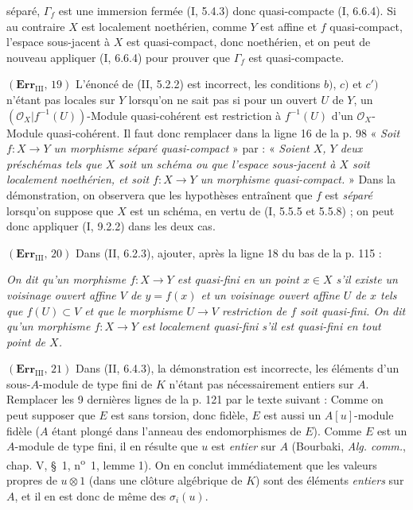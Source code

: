 séparé, $\Gamma_f$ est une immersion fermée (I, 5.4.3) donc quasi-compacte
(I, 6.6.4). Si au contraire $X$ est localement noethérien, comme $Y$ est affine
et $f$ quasi-compact, l'espace sous-jacent à $X$ est quasi-compact, donc
noethérien, et on peut de nouveau appliquer (I, 6.6.4) pour prouver que
$\Gamma_f$ est quasi-compacte.

\noindent\textbf{$(\mathbf{Err}_{\mathrm{III}},\,19)$} L'énoncé de (II,
5.2.2) est incorrect, les conditions $b)$, $c)$ et $c')$ n'étant pas locales
sur $Y$ lorsqu'on ne sait pas si pour un ouvert $U$ de $Y$, un
$(\mathscr O_X|f^{-1}(U))$-Module quasi-cohérent est restriction à $f^{-1}(U)$
d'un $\mathscr O_X$-Module quasi-cohérent. Il faut donc remplacer dans la ligne
16 de la p. 98 « \emph{Soit $f:X\to Y$ un morphisme séparé quasi-compact} »
par : « \emph{Soient $X$, $Y$ deux préschémas tels que $X$ soit un schéma ou
que l'espace sous-jacent à $X$ soit localement noethérien, et soit
$f:X\to Y$ un morphisme quasi-compact.} » Dans la démonstration, on observera
que les hypothèses entraînent que $f$ est \emph{séparé} lorsqu'on suppose que
$X$ est un schéma, en vertu de (I, 5.5.5 et 5.5.8) ; on peut donc appliquer
(I, 9.2.2) dans les deux cas.

\noindent\textbf{$(\mathbf{Err}_{\mathrm{III}},\,20)$} Dans (II, 6.2.3),
ajouter, après la ligne 18 du bas de la p. 115 :

\emph{On dit qu'un morphisme $f:X\to Y$ est quasi-fini en un point $x\in X$
s'il existe un voisinage ouvert affine $V$ de $y=f(x)$ et un voisinage ouvert
affine $U$ de $x$ tels que $f(U)\subset V$ et que le morphisme $U\to V$
restriction de $f$ soit quasi-fini. On dit qu'un morphisme $f:X\to Y$ est
localement quasi-fini s'il est quasi-fini en tout point de $X$.}

\noindent\textbf{$(\mathbf{Err}_{\mathrm{III}},\,21)$} Dans (II, 6.4.3), la
démonstration est incorrecte, les éléments d'un sous-$A$-module de type fini de
$K$ n'étant pas nécessairement entiers sur $A$. Remplacer les 9 dernières lignes
de la p. 121 par le texte suivant : Comme on peut supposer que $E$ est sans
torsion, donc fidèle, $E$ est aussi un $A[u]$-module fidèle ($A$ étant plongé
dans l'anneau des endomorphismes de $E$). Comme $E$ est un $A$-module de type
fini, il en résulte que $u$ est \emph{entier} sur $A$ (Bourbaki,
\emph{Alg. comm.}, chap. V, \S~1, n\textsuperscript{o}~1, lemme 1). On en
conclut immédiatement que les valeurs propres de $u\otimes1$ (dans une clôture
algébrique de $K$) sont des éléments \emph{entiers} sur $A$, et il en est donc
de même des $\sigma_i(u)$.

